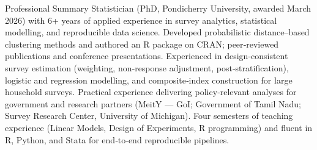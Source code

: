 \documentclass[
a4paper,
11pt]{resume}
\begin{document}
%			
%			
%			
	\resumetitle
	\begin{rSection}{Professional Summary}
		Statistician (PhD, Pondicherry University, awarded March 2026) with 6+ years of applied experience in survey analytics, statistical modelling, and reproducible data science. Developed probabilistic distance–based clustering methods and authored an R package on CRAN; peer‑reviewed publications and conference presentations. Experienced in design‑consistent survey estimation (weighting, non‑response adjustment, post‑stratification), logistic and regression modelling, and composite‑index construction for large household surveys. Practical experience delivering policy‑relevant analyses for government and research partners (MeitY — GoI; Government of Tamil Nadu; Survey Research Center, University of Michigan). Four semesters of teaching experience (Linear Models, Design of Experiments, R programming) and fluent in R, Python, and Stata for end‑to‑end reproducible pipelines.
	\end{rSection}
 
	
\end{document}

